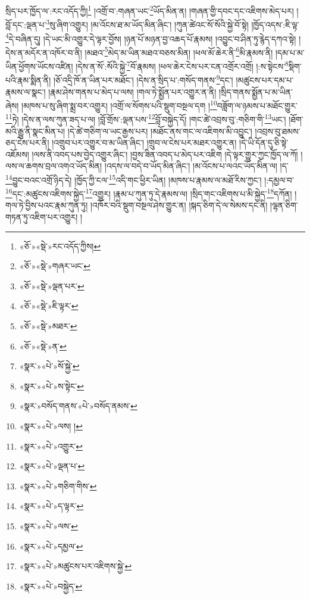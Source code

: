 སྲིད་པར་ཁྱོད་ལ་:རང་འདོད་ཀྱི།\footnote{«ཅོ་»«སྡེ་»རང་འདོད་ཀྱིས།} །འགྲོ་བ་:གཞན་ཡང་\footnote{«ཅོ་»«སྡེ་»གཞར་ཡང་}ཡོད་མིན་ན། །གཞན་གྱི་དབང་དང་འཇིགས་མེད་པར། །བློ་དང་:ལྡན་པ་\footnote{«ཅོ་»«སྡེ་»ལྡན་པར་}སུ་ཞིག་འགྱུར། །མ་འོངས་ཐ་མ་ཡོད་མིན་ཞིང་། །ཀུན་ཚེའང་སོ་སོའི་སྐྱེ་བོ་སྟེ། །ཁྱོད་འདས་:ཇི་ལྟ་\footnote{«ཅོ་»«སྡེ་»ཇི་ལྟར་}དེ་བཞིན་དུ། །དེ་ཡང་མི་འགྱུར་དེ་ལྟར་བྱོས། །ཉན་པོ་མཉན་བྱ་འཆད་པོ་རྣམས། །འབྱུང་བ་ཤིན་ཏུ་རྙེད་དཀའ་སྟེ། །དེས་ན་མདོར་ན་འཁོར་བ་ནི། །མཐའ་\footnote{«ཅོ་»«སྡེ་»མཐར་}མེད་མ་ཡིན་མཐའ་བཅས་མིན། །ཕལ་མོ་ཆེར་ནི་\footnote{«ཅོ་»«སྡེ་»ན་}མི་རྣམས་ནི། །དམ་པ་མ་ཡིན་ཕྱོགས་ཡོངས་འཛིན། །དེས་ན་སོ་:སོའི་སྐྱེ་\footnote{«སྣར་»«པེ་»སོ་སྐྱེ་}བོ་རྣམས། །ཕལ་ཆེར་ངེས་པར་ངན་འགྲོར་འགྲོ། །:ས་སྟེངས་\footnote{«སྣར་»«པེ་»ས་སྟེང་}སྡིག་པའི་རྣམ་སྨིན་ནི། །ཅོ་འདྲི་ཁོ་ན་ཡིན་པར་མཐོང་། །དེས་ན་སྲིད་པ་:གསོད་གནས་\footnote{«སྣར་»བསོད་གནས་«པེ་»བསོད་ནམས་}དང་། །མཚུངས་པར་དམ་པ་རྣམས་ལ་སྣང་། །རྣམ་ཤེས་གནས་པ་མེད་པ་ལས། །གལ་ཏེ་སྨྱོན་པར་འགྱུར་ན་ནི། །སྲིད་གནས་སྨྱོན་པ་མ་ཡིན་ཞེས། །མཁས་པ་སུ་ཞིག་སྨྲ་བར་འགྱུར། །འགྲོ་ལ་སོགས་པའི་སྡུག་བསྔལ་དག །\footnote{«སྣར་»«པེ་»ལས། །}བཟློག་ལ་ཉམས་པ་མཐོང་གྱུར་\footnote{«སྣར་»«པེ་»འགྱུར་}ཏེ། །དེས་ན་ལས་ཀུན་ཟད་པ་ལ། །བློ་གྲོས་:ལྡན་པས་\footnote{«སྣར་»«པེ་»ལྡན་པ་}བློ་བསྐྱེད་དོ། །གང་ཚེ་འབྲས་བུ་:གཅིག་གི་\footnote{«སྣར་»«པེ་»གཅིག་གིས་}ཡང་། །ཐོག་མའི་རྒྱུ་ནི་སྣང་མིན་པ། །དེ་ཚེ་གཅིག་ལ་ཡང་རྒྱས་པར། །མཐོང་ནས་གང་ལ་འཇིགས་མི་འབྱུང་། །འབྲས་བུ་ཐམས་ཅད་ངེས་པར་ནི། །འགྲུབ་པར་འགྱུར་བ་མ་ཡིན་ཞིང་། །གྲུབ་ལ་ངེས་པར་མཐར་འགྱུར་ན། །དེ་ཡི་དོན་དུ་ཅི་སྟེ་འཇོམས། །ལས་ནི་འབད་པས་བྱེད་འགྱུར་ཞིང་། །བྱས་ཟིན་འབད་པ་མེད་པར་འཇིག །དེ་ལྟར་གྱུར་ཀྱང་ཁྱོད་ལ་ཀོ། །ལས་ལ་ཆགས་བྲལ་འགའ་ཡོད་མིན། །འདས་ལ་བདེ་བ་ཡོད་མིན་ཞིང་། །མ་འོངས་པ་ལའང་ཡོད་མིན་ལ། །ད་\footnote{«སྣར་»«པེ་»ད་ལྟར་}བྱུང་བའང་འགྲོ་ཉིད་དེ། །ཁྱོད་ཀྱི་ངལ་\footnote{«སྣར་»«པེ་»ལས་}འདི་གང་ཕྱིར་ཡིན། །མཁས་པ་རྣམས་ལ་མཐོ་རིས་ཀྱང་། །:དམྱལ་བ་\footnote{«སྣར་»«པེ་»དམྱལ་}དང་:མཚུངས་འཇིགས་སྐྱེད་\footnote{«སྣར་»«པེ་»མཚུངས་པར་འཇིགས་སྐྱེ་}འགྱུར། །རྣམ་པ་ཀུན་ཏུ་དེ་རྣམས་ལ། །སྲིད་གང་འཇིགས་པ་མི་སྐྱེད་\footnote{«སྣར་»«པེ་»བསྐྱེད་}དཀོན། །གལ་ཏེ་བྱིས་པའང་རྣམ་ཀུན་ཏུ། །འཁོར་བའི་སྡུག་བསྔལ་ཤེས་གྱུར་ན། །སྐད་ཅིག་དེ་ལ་སེམས་དང་ནི། །ལྷན་ཅིག་གཏན་ཏུ་འཇིག་པར་འགྱུར། །
